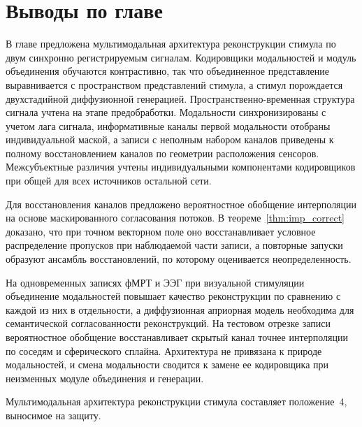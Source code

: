 \section{Выводы по главе}\label{sec4:bimodal_concl}
В главе предложена мультимодальная архитектура реконструкции стимула по двум синхронно регистрируемым сигналам. Кодировщики модальностей и модуль объединения обучаются контрастивно, так что объединенное представление выравнивается с пространством представлений стимула, а стимул порождается двухстадийной диффузионной генерацией. Пространственно-временная структура сигнала учтена на этапе предобработки. Модальности синхронизированы с учетом лага сигнала, информативные каналы первой модальности отобраны индивидуальной маской, а записи с неполным набором каналов приведены к полному восстановлением каналов по геометрии расположения сенсоров. Межсубъектные различия учтены индивидуальными компонентами кодировщиков при общей для всех источников остальной сети.

Для восстановления каналов предложено вероятностное обобщение интерполяции на основе маскированного согласования потоков. В теореме~\ref{thm:imp_correct} доказано, что при точном векторном поле оно восстанавливает условное распределение пропусков при наблюдаемой части записи, а повторные запуски образуют ансамбль восстановлений, по которому оценивается неопределенность.

На одновременных записях фМРТ и ЭЭГ при визуальной стимуляции объединение модальностей повышает качество реконструкции по сравнению с каждой из них в отдельности, а диффузионная априорная модель необходима для семантической согласованности реконструкций. На тестовом отрезке записи вероятностное обобщение восстанавливает скрытый канал точнее интерполяции по соседям и сферического сплайна. Архитектура не привязана к природе модальностей, и смена модальности сводится к замене ее кодировщика при неизменных модуле объединения и генерации.

Мультимодальная архитектура реконструкции стимула составляет положение~4, выносимое на защиту.
